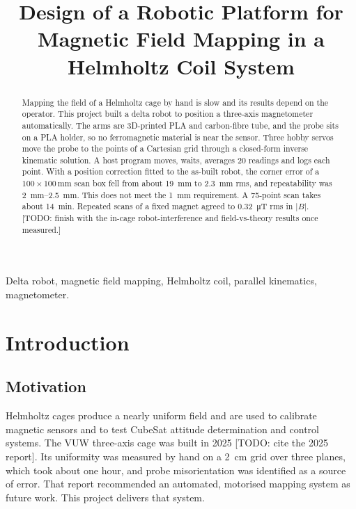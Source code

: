 \documentclass[conference]{IEEEtran}
\begin{document}
\title{Design of a Robotic Platform for Magnetic Field Mapping in a Helmholtz Coil System}
\author{
}
\maketitle

\begin{abstract}
Mapping the field of a Helmholtz cage by hand is slow and its results depend on the
operator. This project built a delta robot to position a three-axis magnetometer
automatically. The arms are 3D-printed PLA and carbon-fibre tube, and the probe sits
on a PLA holder, so no ferromagnetic material is near the sensor. Three hobby servos
move the probe to the points of a Cartesian grid through a closed-form inverse
kinematic solution. A host program moves, waits, averages 20 readings and logs each
point. With a position correction fitted to the as-built robot, the corner error of a
$100\times 100$\,mm scan box fell from about \SI{19}{mm} to \SI{2.3}{mm} rms, and
repeatability was \SIrange{2}{2.5}{mm}. This does not meet the \SI{1}{mm}
requirement. A 75-point scan takes about \SI{14}{min}. Repeated scans of a fixed
magnet agreed to \SI{0.32}{\micro T} rms in $|B|$.
[TODO: finish with the in-cage robot-interference and field-vs-theory results once measured.]
\end{abstract}

\begin{IEEEkeywords}
Delta robot, magnetic field mapping, Helmholtz coil, parallel kinematics, magnetometer.
\end{IEEEkeywords}

\section{Introduction}
\subsection{Motivation}
Helmholtz cages produce a nearly uniform field and are used to calibrate magnetic
sensors and to test CubeSat attitude determination and control systems.
The VUW three-axis cage was built in 2025 [TODO: cite the 2025 report].
Its uniformity was measured by hand on a \SI{2}{cm} grid over three planes, which took
about one hour, and probe misorientation was identified as a source of error.
That report recommended an automated, motorised mapping system as future work.
This project delivers that system.
\end{document}
